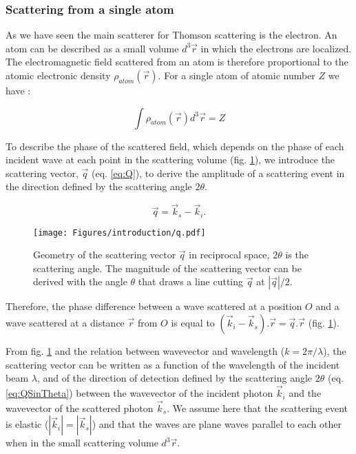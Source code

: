 \subsubsection{Scattering from a single atom}\label{sec:scattering}

As we have seen the main scatterer for Thomson scattering is the electron.
An atom can be described as a small volume $d^3\vec{r}$ in which the electrons are localized.
The electromagnetic field scattered from an atom is therefore proportional to the atomic electronic density $\rho_{atom}(\vec{r})$.
For a single atom of atomic number $Z$ we have :

\begin{equation}
    \int \rho_{atom} (\vec{r}) d^3\vec{r} = Z
\end{equation}

To describe the phase of the scattered field, which depends on the phase of each incident wave at each point in the scattering volume (fig. \ref{fig:q}), we introduce the scattering vector, $\vec{q}$ (eq. \ref{eq:Q}), to derive the amplitude of a scattering event in the direction defined by the scattering angle $2\theta$.

\begin{equation}
    \label{eq:Q}
    \vec{q}=\vec{k}_s-\vec{k}_i.
\end{equation}

\begin{figure}[!htb]
    \centering
    \texttt{[image: Figures/introduction/q.pdf]}
    \caption{
    Geometry of the scattering vector $\vec{q}$ in reciprocal space, $2\theta$ is the scattering angle.
    The magnitude of the scattering vector can be derived with the angle $\theta$ that draws a line cutting $\vec{q}$ at $|\vec{q}|/2$.
    }
    \label{fig:q}
\end{figure}

Therefore, the phase difference between a wave scattered at a position $O$ and a wave scattered at a distance $\vec{r}$ from $O$ is equal to $(\vec{k}_i - \vec{k}_s).\vec{r} = \vec{q}.\vec{r}$ (fig. \ref{fig:q}).

From fig. \ref{fig:q} and the relation between wavevector and wavelength ($k = 2 \pi/\lambda$), the scattering vector can be written as a function of the wavelength of the incident beam $\lambda$, and of the direction of detection defined by the scattering angle $2\theta$ (eq. \ref{eq:QSinTheta}) between the wavevector of the incident photon $\vec{k}_i$ and the wavevector of the scattered photon $\vec{k}_s$.
We assume here that the scattering event is elastic ($|\vec{k}_i|=|\vec{k}_s|$) and that the waves are plane waves parallel to each other when in the small scattering volume $d^3\vec{r}$.

